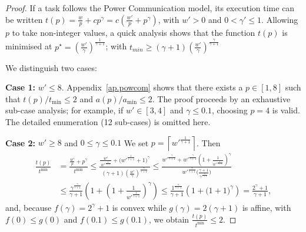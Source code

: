 \documentclass{article}
\begin{document}
\begin{proof}
If a task follows the Power Communication model, its execution time can be written
$t(p) = \frac{w}{p} + c p^\gamma
       = c \left( \frac{w'}{p} + p^\gamma \right)$,
with $w'>0$ and $0<\gamma' \le 1$. Allowing $p$ to take non-integer values, a quick analysis shows that
the function $t(p)$ is minimised at
$p^{\star} = \left( \frac{w'}{\gamma} \right)^{\frac{1}{\gamma+1}}$; with
 $t_{min} \geq \left( \gamma+1\right)\left( \frac{w'}{\gamma} \right)^{\frac{\gamma}{\gamma+1}}$

We distinguish two cases:

\textbf{Case 1:} $w' \le 8$.  
Appendix~\ref{ap.powcom} shows that there exists a $p\in[1,8]$ such that
$t(p)/t_{\min}\le 2$ and $a(p)/a_{\min}\le 2$.
The proof proceeds by an exhaustive sub-case analysis; for example,
if $w' \in [3,4]$ and $\gamma\le 0.1$, choosing $p=4$ is valid.
The detailed enumeration (12 sub-cases) is omitted here.


\textbf{Case 2:} $w' \ge 8$ and $0\le\gamma\le 0.1$  
We set \(p=\left\lceil w'^{\frac{1}{\gamma+1}}\right\rceil\).  
Then  
\begin{align*}
\frac{t(p)}{t^{\min}} &= \frac{\frac{w'}{p}+p^\gamma}{t^{\min}} \le \frac{\frac{w'}{\,w'^{\frac{1}{\gamma+1}}} + \bigl(w'^{\frac{1}{\gamma+1}}+1\bigr)^\gamma}
        {(\gamma+1)\!\left(\frac{w'}{\gamma}\right)^{\frac{\gamma}{\gamma+1}}} \le \frac{w'^{\frac{\gamma}{\gamma+1}}
          + w'^{\frac{\gamma}{\gamma+1}}\!\left(1+\frac{1}{w'^{\frac{1}{\gamma+1}}}\right)^\gamma}
        {w'^{\frac{\gamma}{\gamma+1}}
          \bigl(\tfrac{\gamma+1}{\gamma^{\frac{\gamma}{\gamma+1}}}\bigr)} \\
&\le \frac{\gamma^{\frac{\gamma}{\gamma+1}}}{\gamma+1}
       \left(1+\left(1+\frac{1}{w'^{\frac{1}{\gamma+1}}}\right)^\gamma\right) \le \frac{1^{\frac{\gamma}{\gamma+1}}}{\gamma+1}
       \left(1+\bigl(1+1\bigr)^\gamma\right)
     = \frac{2^\gamma+1}{\gamma+1},
\end{align*}
and, because \(f(\gamma)=2^\gamma+1\) is convex while 
\(g(\gamma)=2(\gamma+1)\) is affine, with 
\(f(0)\le g(0)\) and \(f(0.1)\le g(0.1)\), we obtain
\(\frac{t(p)}{t^{\min}}\le 2.\)


\end{proof}
\end{document}
